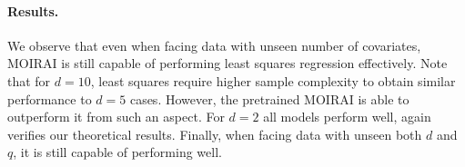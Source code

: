 \paragraph{Results.}
We observe that even when facing data with unseen number of covariates, MOIRAI is still capable of performing least squares regression effectively.
Note that for $d=10$, least squares require higher sample complexity to obtain similar performance to $d=5$ cases.
However, the pretrained MOIRAI is able to outperform it from such an aspect.
For $d=2$ all models perform well, again verifies our theoretical results.
Finally, when facing data with unseen both $d$ and $q$, it is still capable of performing well.